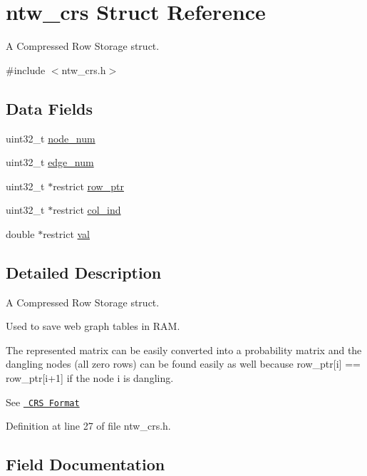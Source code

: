 \hypertarget{structntw__crs}{}\section{ntw\+\_\+crs Struct Reference}
\label{structntw__crs}


A Compressed Row Storage struct.  




{\ttfamily \#include $<$ntw\+\_\+crs.\+h$>$}

\subsection*{Data Fields}
\begin{DoxyCompactItemize}
\item 
uint32\+\_\+t \mbox{\hyperlink{structntw__crs_a36a11fbae59bf6159e40cb18e5f37ada}{node\+\_\+num}}
\item 
uint32\+\_\+t \mbox{\hyperlink{structntw__crs_a85160ebade6d93ba77c9e90f2f237cea}{edge\+\_\+num}}
\item 
uint32\+\_\+t $\ast$restrict \mbox{\hyperlink{structntw__crs_abf117885ca226f2a82ff28dca7177c34}{row\+\_\+ptr}}
\item 
uint32\+\_\+t $\ast$restrict \mbox{\hyperlink{structntw__crs_a3f5430e0836427a7da3b0bcceb3cc148}{col\+\_\+ind}}
\item 
double $\ast$restrict \mbox{\hyperlink{structntw__crs_a5ed2cc918a69051b395e9b151a66867f}{val}}
\end{DoxyCompactItemize}


\subsection{Detailed Description}
A Compressed Row Storage struct. 

Used to save web graph tables in R\+AM.

The represented matrix can be easily converted into a probability matrix and the dangling nodes (all zero rows) can be found easily as well because row\+\_\+ptr\mbox{[}i\mbox{]} == row\+\_\+ptr\mbox{[}i+1\mbox{]} if the node i is dangling.

See \href{http://netlib.org/linalg/html_templates/node91.html}\texttt{ C\+RS Format} 

Definition at line 27 of file ntw\+\_\+crs.\+h.



\subsection{Field Documentation}
\mbox{\label{structntw__crs_a3f5430e0836427a7da3b0bcceb3cc148}} 
